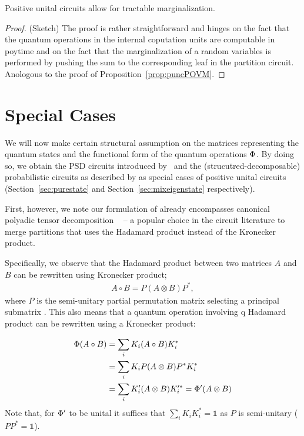 \begin{proposition}
	Positive unital circuits allow for tractable marginalization.
\end{proposition}

\begin{proof}
	(Sketch) The proof is rather straightforward and hinges on the fact that the quantum operations in the internal coputation units are computable in poytime and on the fact that the marginalization of a random variables is performed by pushing the sum to the corresponding leaf in the partition circuit. Anologous to the proof of Proposition~\ref{prop:puncPOVM}.
\end{proof}





\section{Special Cases}
\label{sec:special_cases}

We will now make certain structural assumption on the matrices representing the quantum states and the functional form of the quantum operations $\Phi$. By doing so, we obtain the PSD circuits introduced by~\citet{sladek2023encoding} and the (strucutred-decomposable) probabilistic circuits as described by \citet{peharz2020einsum} as special cases of positive unital circuits (Section~\ref{sec:purestate} and Section~\ref{sec:mixeigenstate} respectively).


First, however, we note our formulation of \puncs already encompasses canonical polyadic tensor decomposition ~\citep{carroll1970analysis} -- a popular choice in the circuit literature \citep{shih2021hyperspns,loconte2024relationship} to merge partitions that uses the Hadamard product instead of the Kronecker product.

Specifically, we observe that the Hadamard product between two matrices $A$ and $B$ can be rewritten using Kronecker product;
\begin{align}
	A \circ B = P (A \otimes B) P^*,
\end{align}
where $P$ is the semi-unitary partial permutation matrix selecting a principal submatrix \citep[Corollary 2]{visick2000quantitative}.
This also means that a quantum operation involving q Hadamard product can be rewritten using a Kronecker product:

\begin{align}
	\Phi (A \circ B )
	 & = \sum_i K_i (A\circ B) K_i^*
	\nonumber
	\\
	 & = \sum_i K_i P  (A\otimes B) P^* K_i^*
	\nonumber
	\\
	 & =  \sum_i K_i'  (A\otimes B) K_i'^* = \Phi'(A \otimes B)
\end{align}
Note that, for $\Phi'$ to be unital it suffices that $\sum_i K_i K_i^* = \mathbb{1}$ as $P$ is semi-unitary ($PP^* = \mathbb{1}$).

